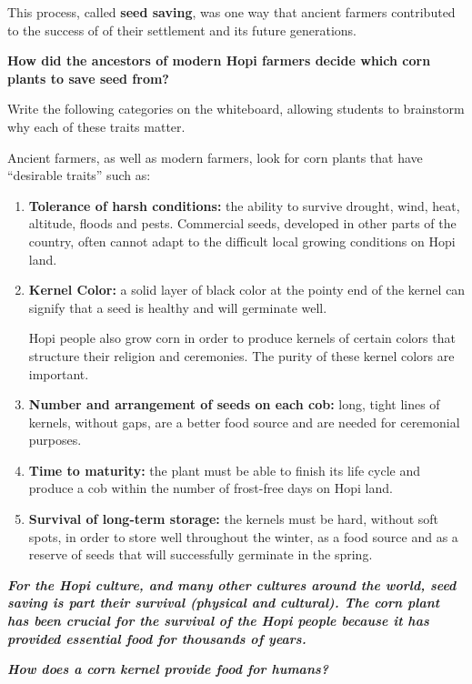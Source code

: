 \documentclass[12pt,]{article}
\begin{document}
This process, called \textbf{seed saving}, was one way that ancient farmers contributed to the success of of their settlement and its future generations.

\textbf{How did the ancestors of modern Hopi farmers decide which corn plants to save seed from? }

Write the following categories on the whiteboard, allowing students to brainstorm why each of these traits matter.

Ancient farmers, as well as modern farmers, look for corn plants that have ``desirable traits'' such as:

\begin{enumerate}
\def\labelenumi{\arabic{enumi}.}
\item
  \textbf{Tolerance of harsh conditions:} the ability to survive drought, wind, heat, altitude, floods and pests. Commercial seeds, developed in other parts of the country, often cannot adapt to the difficult local growing conditions on Hopi land.
\item
  \textbf{Kernel Color:} a solid layer of black color at the pointy end of the kernel can signify that a seed is healthy and will germinate well.

  Hopi people also grow corn in order to produce kernels of certain colors that structure their religion and ceremonies. The purity of these kernel colors are important.
\item
  \textbf{Number and arrangement of seeds on each cob: }long, tight lines of kernels, without gaps, are a better food source and are needed for ceremonial purposes.
\item
  \textbf{Time to maturity:} the plant must be able to finish its life cycle and produce a cob within the number of frost-free days on Hopi land.\\
\item
  \textbf{Survival of long-term storage: }the kernels must be hard, without soft spots, in order to store well throughout the winter, as a food source and as a reserve of seeds that will successfully germinate in the spring.
\end{enumerate}

\textbf{\emph{For the Hopi culture, and many other cultures around the world, seed saving is part their survival (physical and cultural). The corn plant has been crucial for the survival of the Hopi people because it has provided essential food for thousands of years. }}

\textbf{\emph{How does a corn kernel provide food for humans? }}
\end{document}
